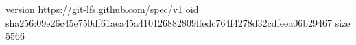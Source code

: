 version https://git-lfs.github.com/spec/v1
oid sha256:09e26c45e750df61aea45a410126882809ffedc764f4278d32cdfeea06b29467
size 5566
